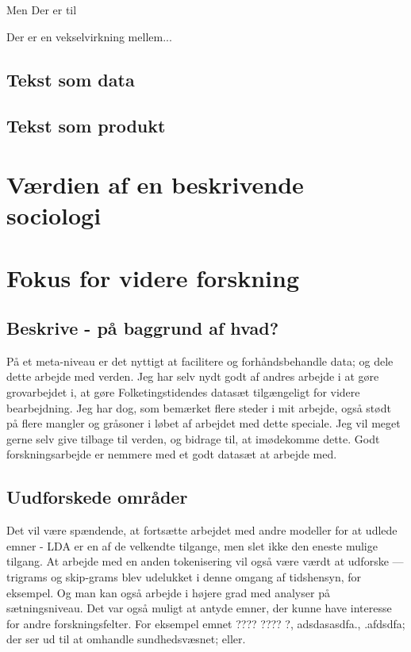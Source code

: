 Men 
Der er til

Der er en vekselvirkning mellem...

\section{Tekst som data}

\section{Tekst som produkt}

\chapter{Værdien af en beskrivende sociologi}

\chapter{Fokus for videre forskning}

\section{Beskrive - på baggrund af hvad?}
På et meta-niveau er det nyttigt at facilitere og forhåndsbehandle data; og dele dette arbejde med verden.
Jeg har selv nydt godt af andres arbejde i at gøre grovarbejdet i, at gøre Folketingstidendes datasæt tilgængeligt for videre bearbejdning.
Jeg har dog, som bemærket flere steder i mit arbejde, også stødt på flere mangler og gråsoner i løbet af arbejdet med dette speciale.
Jeg vil meget gerne selv give tilbage til verden, og bidrage til, at imødekomme dette.
Godt forskningsarbejde er nemmere med et godt datasæt at arbejde med.

\section{Uudforskede områder}

Det vil være spændende, at fortsætte arbejdet med andre modeller for at udlede emner - LDA er en af de velkendte tilgange, men slet ikke den eneste mulige tilgang.
At arbejde med en anden tokenisering vil også være værdt at udforske — trigrams og skip-grams blev udelukket i denne omgang af tidshensyn, for eksempel. Og man kan også arbejde i højere grad med analyser på sætningsniveau.
Det var også muligt at antyde emner, der kunne have interesse for andre forskningsfelter.
For eksempel emnet ???? ???? ?, adsdasasdfa., .afdsdfa; der ser ud til at omhandle sundhedsvæsnet; eller.
